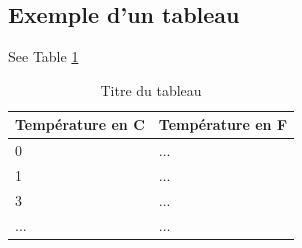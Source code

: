 \subsection{Exemple d'un tableau}

See Table \ref{tab:tableau1}

\begin{table}[h!]
\begin{center}
	\begin{tabular}{|l|l|}
		\hline
		\textbf{Température en C} & \textbf{Température en F} \\
		\hline
		\hline
		0 & ... \\
		\hline
		1 & ... \\
		\hline
		3 & ... \\
		\hline
		... & ... \\
		\hline
	\end{tabular}
\end{center}
\caption{Titre du tableau}
\label{tab:tableau1}
\end{table}

